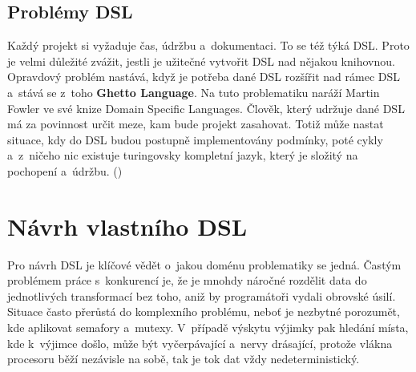 \documentclass[male, czech]{kithesis}
\begin{document}
{\begin{center}
\end{center}
}

\section{Problémy DSL}

Každý projekt si vyžaduje čas, údržbu a~dokumentaci.
To se též týká DSL.
Proto je velmi důležité zvážit, 
jestli je užitečné vytvořit DSL nad nějakou knihovnou.
Opravdový problém nastává, 
když je potřeba dané DSL rozšířit nad rámec DSL
a~stává se z~toho \textbf{Ghetto Language}.
Na tuto problematiku naráží Martin Fowler ve své knize Domain Specific Languages.
Člověk,
který udržuje dané DSL má za povinnost určit meze,
kam bude projekt zasahovat. 
Totiž může nastat situace,
kdy do DSL budou postupně implementovány podmínky,
poté cykly
a~z~ničeho nic existuje turingovsky kompletní jazyk, 
který je složitý na pochopení a~údržbu. (\cite[s.~38-39]{Fowlerc2011})


\chapter{Návrh vlastního DSL}

Pro návrh DSL je klíčové vědět o~jakou doménu problematiky se jedná.
Častým problémem práce s~konkurencí je, 
že je mnohdy náročné rozdělit data do jednotlivých transformací bez toho, 
aniž by programátoři vydali obrovské úsilí.
Situace často přerůstá do komplexního problému, 
neboť je nezbytné porozumět, 
kde aplikovat semafory a~mutexy. 
V~případě výskytu výjimky pak hledání místa, 
kde k~výjimce došlo, 
může být vyčerpávající a~nervy drásající,
protože vlákna procesoru běží nezávisle na sobě,
tak je tok dat vždy nedeterministický.
\end{document}
